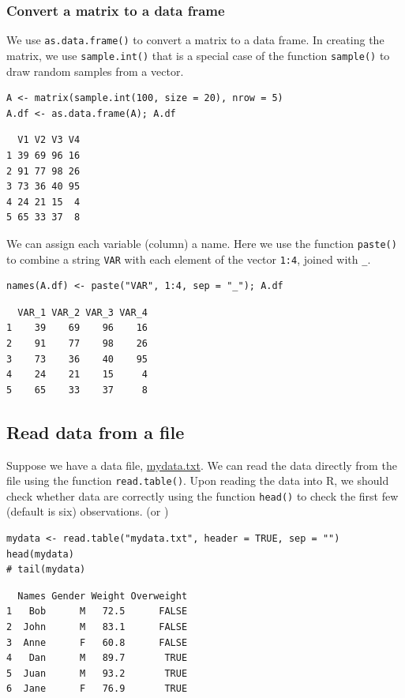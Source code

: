 \documentclass[a4paper,11pt]{article}
\begin{document}
\subsubsection*{Convert a matrix to a data frame}
\label{sec:orgbca290f}

We use \texttt{as.data.frame()} to convert a matrix to a data frame. In
creating the matrix, we use \texttt{sample.int()} that is a special case of
the function \texttt{sample()} to draw random samples from a vector.
\begin{verbatim}
A <- matrix(sample.int(100, size = 20), nrow = 5)
A.df <- as.data.frame(A); A.df
\end{verbatim}

\begin{verbatim}
  V1 V2 V3 V4
1 39 69 96 16
2 91 77 98 26
3 73 36 40 95
4 24 21 15  4
5 65 33 37  8
\end{verbatim}

We can assign each variable (column) a name. Here we use the function
\texttt{paste()} to combine a string \texttt{VAR} with each element of the vector
\texttt{1:4}, joined with \texttt{\_}.
\begin{verbatim}
names(A.df) <- paste("VAR", 1:4, sep = "_"); A.df
\end{verbatim}

\begin{verbatim}
  VAR_1 VAR_2 VAR_3 VAR_4
1    39    69    96    16
2    91    77    98    26
3    73    36    40    95
4    24    21    15     4
5    65    33    37     8
\end{verbatim}


\subsection{Read data from a file}
\label{sec:org19bd2eb}

Suppose we have a data file, \url{mydata.txt}. We can read the data
directly from the file using the function \texttt{read.table()}. Upon reading
the data into R, we should check whether data are correctly using the
function \texttt{head()} to check the first few (default is six)
observations. (or )

\begin{verbatim}
mydata <- read.table("mydata.txt", header = TRUE, sep = "")
head(mydata)
# tail(mydata)
\end{verbatim}

\begin{verbatim}
  Names Gender Weight Overweight
1   Bob      M   72.5      FALSE
2  John      M   83.1      FALSE
3  Anne      F   60.8      FALSE
4   Dan      M   89.7       TRUE
5  Juan      M   93.2       TRUE
6  Jane      F   76.9       TRUE
\end{verbatim}
\end{document}
